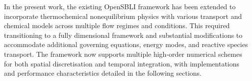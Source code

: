 In the present work, the existing OpenSBLI framework has been extended to incorporate thermochemical nonequilibrium physics with various transport and chemical models across multiple flow regimes and conditions. This required transitioning to a fully dimensional framework and substantial modifications to accommodate additional governing equations, energy modes, and reactive species transport. The framework now supports multiple high-order numerical schemes for both spatial discretisation and temporal integration, with implementations and performance characteristics detailed in the following sections.



